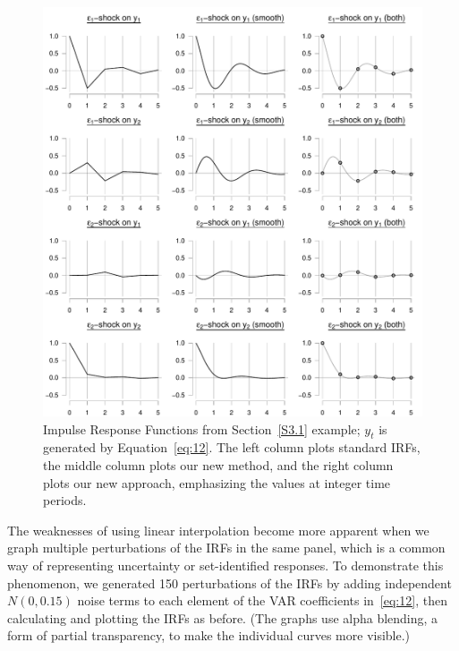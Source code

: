 \documentclass[12pt,fleqn]{article}
\begin{document}
\begin{figure}[t]
  \centering
  \includegraphics{graphs/numeric.pdf}
  \caption{Impulse Response Functions from Section~\ref{S3.1} example;
    $y_t$ is generated by Equation~\eqref{eq:12}. The left column
    plots standard IRFs, the middle column plots our new method, and
    the right column plots our new approach, emphasizing the values at
    integer time periods.}
  \label{fig:3}
\end{figure}

The weaknesses of using linear interpolation become more apparent when
we graph multiple perturbations of the IRFs in the same panel, which
is a common way of representing uncertainty or set-identified
responses. To demonstrate this phenomenon, we generated 150
perturbations of the IRFs by adding independent $N(0, 0.15)$ noise
terms to each element of the VAR coefficients in~\eqref{eq:12}, then
calculating and plotting the IRFs as before. (The graphs use alpha
blending, a form of partial transparency, to make the individual
curves more visible.)
\end{document}
